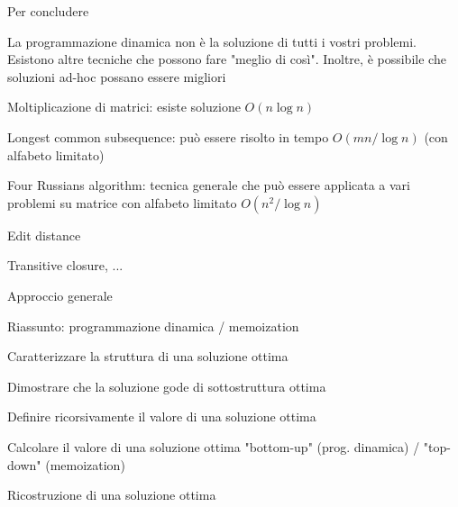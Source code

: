 \begin{frame}{Per concludere}

\vspace{-6pt}
\begin{myboxtitle}
La programmazione dinamica non è la soluzione di tutti i vostri problemi. Esistono altre tecniche che possono fare "meglio di così". Inoltre, è possibile che soluzioni ad-hoc possano essere migliori
\end{myboxtitle}

\begin{myboxtitle}[Esempi]
\BI
\item \alert{Moltiplicazione di matrici}: esiste soluzione $O(n \log n)$
\item \alert{Longest common subsequence}: può essere risolto in tempo $O(mn/\log n)$ (con alfabeto limitato)
\item \alert{Four Russians algorithm}: tecnica generale che può essere applicata a vari problemi su matrice con alfabeto limitato $O(n^2/\log n)$
\BI
\item Edit distance
\item Transitive closure, ...
\EI
\EI
\end{myboxtitle}

\end{frame}

\begin{frame}{Approccio generale}

\vspace{-6pt}

\end{frame}

\begin{frame}{Riassunto: programmazione dinamica / memoization}

\vspace{-6pt}
\begin{myboxtitle}[Fasi]
\BIL 
\item Caratterizzare la \alert{struttura} di una soluzione ottima
\item Dimostrare che la soluzione gode di \alert{sottostruttura ottima}
\item Definire ricorsivamente il \alert{valore} di una soluzione ottima
\item Calcolare il \alert{valore} di una soluzione ottima "bottom-up" (prog. dinamica) / "top-down" (memoization)
\item \alert{Ricostruzione} di una soluzione ottima 
\EIL
\end{myboxtitle}

\end{frame}





